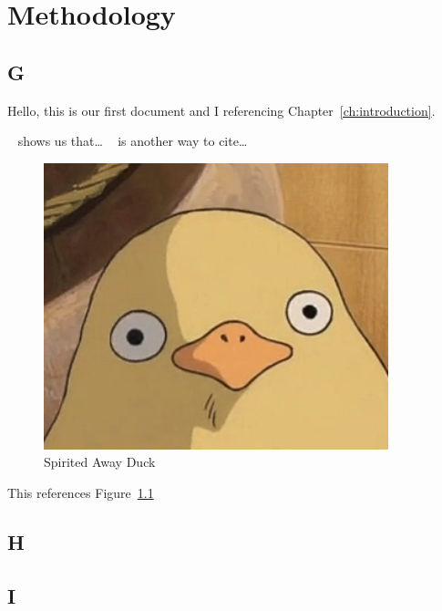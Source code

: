 \chapter{Methodology}\label{ch:methodology}

\section{G}\label{sec:G}
Hello, this is our first document and I referencing Chapter~\ref{ch:introduction}.

~\cite{ani2019victory} shows us that\ldots
~\cite*{ani2019victory} is another way to cite\ldots


\begin{figure}[h]
    \centering
    \includegraphics[width=10cm]{figures/SpiritedAwayDuck3}
    \caption{Spirited Away Duck}
    \label{fig:SpiritedAwayDuck}
\end{figure}


This references Figure~\ref{fig:SpiritedAwayDuck}

\lipsum[1-5]

\section{H}\label{sec:H}
\lipsum[1-5]

\section{I}\label{sec:I}
\lipsum[1-5]